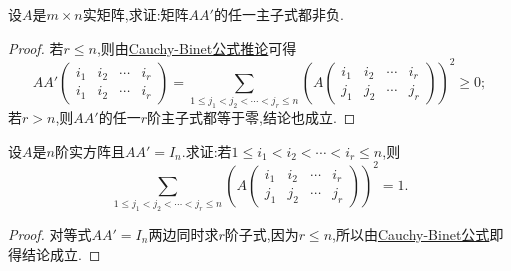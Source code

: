 \documentclass[../../main.tex]{subfiles}%
\begin{document}
\begin{example}
设\(A\)是\(m\times n\)实矩阵,求证:矩阵\(AA'\)的任一主子式都非负.
\end{example}
\begin{proof}

若\(r\leqslant  n\),则由\hyperref[corollary:Cauchy-Binet公式推论]{Cauchy-Binet公式推论}可得
\[
AA'\begin{pmatrix}
i_1 & i_2 & \cdots & i_r\\
i_1 & i_2 & \cdots & i_r
\end{pmatrix}=\sum_{1\leqslant  j_1<j_2<\cdots<j_r\leqslant  n}\left(A\begin{pmatrix}
i_1 & i_2 & \cdots & i_r\\
j_1 & j_2 & \cdots & j_r
\end{pmatrix}\right)^2\geqslant 0;
\]
若\(r > n\),则\(AA'\)的任一\(r\)阶主子式都等于零,结论也成立.

\end{proof}

\begin{example}
设\(A\)是\(n\)阶实方阵且\(AA' = I_n\).求证:若\(1\leqslant  i_1 < i_2 < \cdots < i_r\leqslant  n\),则
\[
\sum_{1\leqslant  j_1<j_2<\cdots<j_r\leqslant  n}\left(A\begin{pmatrix}
i_1 & i_2 & \cdots & i_r\\
j_1 & j_2 & \cdots & j_r
\end{pmatrix}\right)^2 = 1.
\]
\end{example}
\begin{proof}

对等式$AA' = I_n$两边同时求$r$阶子式,因为$r\leqslant  n$,所以由\hyperref[theorem:Cauchy-Binet公式]{Cauchy-Binet公式}即得结论成立.

\end{proof}
\end{document}
